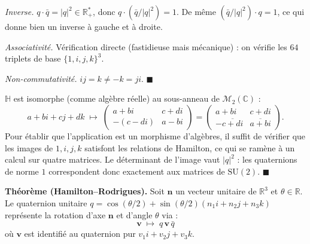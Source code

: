 \begin{mdframed}[style=proofbar]
  \textit{Inverse.} $q \cdot \bar{q} = |q|^2 \in \mathbb{R}_+^*$, donc
  $q \cdot (\bar{q}/|q|^2) = 1$. De même $(\bar{q}/|q|^2) \cdot q = 1$,
  ce qui donne bien un inverse à gauche et à droite.

  \textit{Associativité.} Vérification directe (fastidieuse mais mécanique) :
  on vérifie les $64$ triplets de base ${\{1,i,j,k\}}^3$.

  \textit{Non-commutativité.} $ij = k \neq -k = ji$.
  \hfill$\blacksquare$
\end{mdframed}


\begin{mdframed}[style=proofbar]
  $\mathbb{H}$ est isomorphe (comme algèbre réelle) au sous-anneau de
  $\mathcal{M}_2(\mathbb{C})$ :
  \[
    a + bi + cj + dk \;\longmapsto\;
    \begin{pmatrix} a+bi & c+di \\ -(c-di) & a-bi \end{pmatrix}
    =
    \begin{pmatrix} a+bi & c+di \\ -\overline{c+di} & \overline{a+bi} \end{pmatrix}.
  \]
  Pour établir que l'application est un morphisme d'algèbres, il suffit de
  vérifier que les images de $1,i,j,k$ satisfont les relations de Hamilton, ce
  qui se ramène à un calcul sur quatre matrices. Le déterminant de l'image vaut
  $|q|^2$ : les quaternions de norme $1$ correspondent donc exactement aux
  matrices de $\mathrm{SU}(2)$.
  \hfill$\blacksquare$
\end{mdframed}

\decsep{}


\begin{tcolorbox}[thmbox]
  \textbf{Théorème (Hamilton–Rodrigues).}\enspace%
  Soit $\mathbf{n}$ un vecteur unitaire de $\mathbb{R}^3$ et $\theta \in \mathbb{R}$.
  Le quaternion unitaire $q = \cos(\theta/2) + \sin(\theta/2)(n_1 i + n_2 j + n_3 k)$
  représente la rotation d'axe $\mathbf{n}$ et d'angle $\theta$ via :
  \[
    \mathbf{v} \;\longmapsto\; q\,\mathbf{v}\,\bar{q}
  \]
  où $\mathbf{v}$ est identifié au quaternion pur $v_1 i + v_2 j + v_3 k$.
\end{tcolorbox}


